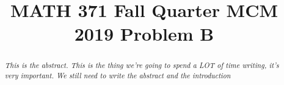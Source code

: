 \documentclass[twocolumn,10pt]{asme2ej}
\title{MATH 371 Fall Quarter MCM 2019 Problem B}
\begin{document}
\maketitle


\begin{abstract}
{\it This is the abstract. This is the thing we're going to spend a LOT of time writing, it's very important. We still need to write the abstract and the introduction
}
\end{abstract}


\end{document}
